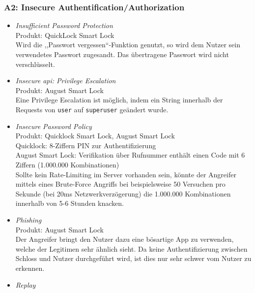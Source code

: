     \subsubsection*{A2: Insecure Authentification/Authorization}
        \begin{itemize}[leftmargin=0cm,label={}]
            \item \emph{Insufficient Password Protection}\cite{Ye2017}\label{vuln:pwdprot}\\
    	        Produkt: QuickLock Smart Lock\\ 
                Wird die ,,Passwort vergessen``-Funktion genutzt, so wird dem Nutzer sein verwendetes Passwort zugesandt. 
                Das übertragene Passwort wird nicht verschlüsselt.
            \item \emph{Insecure \gls{api}: Privilege Escalation}\cite{Fuller2017,Lariviere2015}\label{vuln:privesc}\\
                Produkt: August Smart Lock\\
                Eine Privilege Escalation ist möglich, indem ein String innerhalb der Requests von \colorbox{light-gray}{\lstinline{user}} auf \colorbox{light-gray}{\lstinline{superuser}} geändert wurde.
            \item \emph{Insecure Password Policy}\cite{Rose2016,Ye2017,Jmaxxz2015a}\label{vuln:pwdpol}\\
                Produkt: Quicklock Smart Lock, August Smart Lock\\
                Quicklock: 8-Ziffern PIN zur Authentifizierung\\
                August Smart Lock: Verifikation über Rufnummer enthält einen Code mit 6 Ziffern (1.000.000 Kombinationen)\\
                Sollte kein Rate-Limiting im Server vorhanden sein, könnte der Angreifer mittels eines Brute-Force Angriffs bei beispielsweise 50 Versuchen pro Sekunde (bei 20ms Netzwerkverzögerung) die 1.000.000 Kombinationen innerhalb von 5-6 Stunden knacken.
            \item \emph{Phishing}\cite{Ye2017}\label{vuln:phishing}\\
    	        Produkt: August Smart Lock\\ 
                Der Angreifer bringt den Nutzer dazu eine bösartige App zu verwenden, welche der Legitimen sehr ähnlich sieht. 
                Da keine Authentifizierung zwischen Schloss und Nutzer durchgeführt wird, ist dies nur sehr schwer vom Nutzer zu erkennen.
            \item \emph{Replay}\cite{Tierney2018,Rose2016,Ho2016}\label{vuln:replay}\\

\end{itemize}
